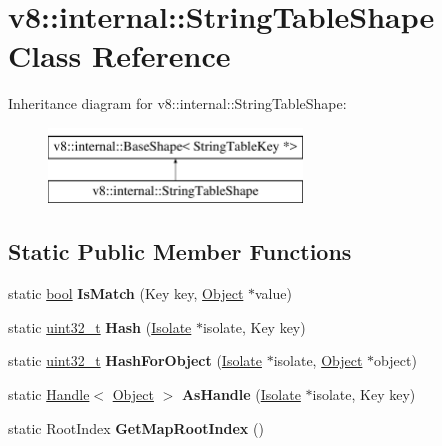 \hypertarget{classv8_1_1internal_1_1StringTableShape}{}\section{v8\+:\+:internal\+:\+:String\+Table\+Shape Class Reference}
\label{classv8_1_1internal_1_1StringTableShape}
Inheritance diagram for v8\+:\+:internal\+:\+:String\+Table\+Shape\+:\begin{figure}[H]
\begin{center}
\leavevmode
\includegraphics[height=2.000000cm]{classv8_1_1internal_1_1StringTableShape}
\end{center}
\end{figure}
\subsection*{Static Public Member Functions}
\begin{DoxyCompactItemize}
\item 
\mbox{\label{classv8_1_1internal_1_1StringTableShape_a303d208c0e766281204769271a7d9872}} 
static \mbox{\hyperlink{classbool}{bool}} {\bfseries Is\+Match} (Key key, \mbox{\hyperlink{classv8_1_1internal_1_1Object}{Object}} $\ast$value)
\item 
\mbox{\label{classv8_1_1internal_1_1StringTableShape_a580b2085d8e37b7de7a068e0e80f2ffb}} 
static \mbox{\hyperlink{classuint32__t}{uint32\+\_\+t}} {\bfseries Hash} (\mbox{\hyperlink{classv8_1_1internal_1_1Isolate}{Isolate}} $\ast$isolate, Key key)
\item 
\mbox{\label{classv8_1_1internal_1_1StringTableShape_ade5bf8fa186a2198fbc2f7e1542dc731}} 
static \mbox{\hyperlink{classuint32__t}{uint32\+\_\+t}} {\bfseries Hash\+For\+Object} (\mbox{\hyperlink{classv8_1_1internal_1_1Isolate}{Isolate}} $\ast$isolate, \mbox{\hyperlink{classv8_1_1internal_1_1Object}{Object}} $\ast$object)
\item 
\mbox{\label{classv8_1_1internal_1_1StringTableShape_aaaa627e93e5f68e55a06f3a1c61f49b6}} 
static \mbox{\hyperlink{classv8_1_1internal_1_1Handle}{Handle}}$<$ \mbox{\hyperlink{classv8_1_1internal_1_1Object}{Object}} $>$ {\bfseries As\+Handle} (\mbox{\hyperlink{classv8_1_1internal_1_1Isolate}{Isolate}} $\ast$isolate, Key key)
\item 
\mbox{\label{classv8_1_1internal_1_1StringTableShape_acbca31be89f44eb8810ac4cbe4dc2835}} 
static Root\+Index {\bfseries Get\+Map\+Root\+Index} ()
\end{DoxyCompactItemize}
